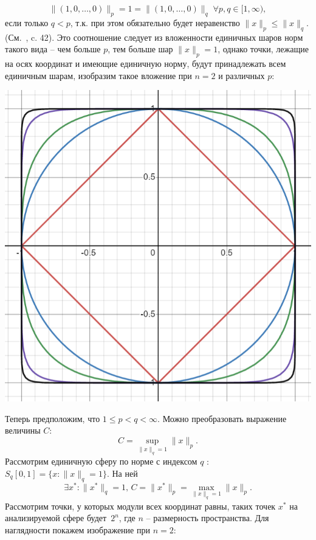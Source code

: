 \documentclass{article}
\begin{document}
$$ \|(1,0,\ldots,0)\|_p = 1 = \|(1,0,\ldots,0)\|_q \; \forall p,q \in [1,\infty), $$ 
если только $q < p$, т.к. при этом обязательно будет неравенство $\|x\|_p \leqslant \|x\|_q$. (См.~\cite{Zorich2}, c. 42). Это соотношение следует из вложенности единичных шаров норм такого вида -- чем больше $p$, тем больше шар $\|x\|_p = 1$, однако точки, лежащие на осях координат и имеющие единичную норму, будут принадлежать всем единичным шарам, изобразим такое вложение при $n=2$ и различных $p$:
\begin{center}
\includegraphics[scale = 0.8]{pictures/p_spheres.png}
\end{center}
Теперь предположим, что $1 \leqslant p < q < \infty. $ Можно преобразовать выражение величины $C$:
$$ C = \sup\limits_{\|x\|_q=1}{\|x\|_p}. $$
Рассмотрим единичную сферу по норме с индексом $q$ : $ S_q[0,1] = \{x: \|x\|_q = 1\}.$ На ней
$$\exists x^*: \|x^*\|_q = 1, \, C = \|x^*\|_p = \max\limits_{\|x\|_q=1}{\|x\|_p}.$$
Рассмотрим точки, у которых модули всех координат равны, таких точек $x^*$ на анализируемой сфере будет~$2^n$, где $n$ -- размерность пространства. Для наглядности покажем изображение при $n=2$:
\end{document}

